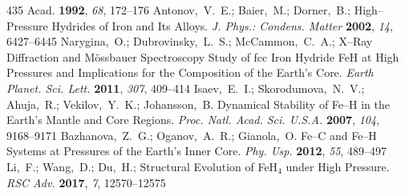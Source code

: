 \documentclass[12pt,letterpaper,oneside]{article}
\begin{document}
\begin{mcitethebibliography}{435}
{  Acad.} \textbf{1992}, \emph{68}, 172--176\relax
\mciteBstWouldAddEndPuncttrue
\mciteSetBstMidEndSepPunct{\mcitedefaultmidpunct}
{\mcitedefaultendpunct}{\mcitedefaultseppunct}\relax
\EndOfBibitem
{}
Antonov,~V.~E.; Baier,~M.; Dorner,~B.;
    High--Pressure Hydrides of Iron and Its Alloys. \emph{J.
  Phys.: Condens. Matter} \textbf{2002}, \emph{14}, 6427--6445\relax
\mciteBstWouldAddEndPuncttrue
\mciteSetBstMidEndSepPunct{\mcitedefaultmidpunct}
{\mcitedefaultendpunct}{\mcitedefaultseppunct}\relax
\EndOfBibitem
{}
Narygina,~O.; Dubrovinsky,~L.~S.; McCammon,~C.~A.;
    X--Ray Diffraction and M{\"o}ssbauer Spectroscopy Study of
  fcc Iron Hydride FeH at High Pressures and Implications for the Composition
  of the Earth's Core. \emph{Earth Planet. Sci. Lett.} \textbf{2011},
  \emph{307}, 409--414\relax
\mciteBstWouldAddEndPuncttrue
\mciteSetBstMidEndSepPunct{\mcitedefaultmidpunct}
{\mcitedefaultendpunct}{\mcitedefaultseppunct}\relax
\EndOfBibitem
{}
Isaev,~E.~I.; Skorodumova,~N.~V.; Ahuja,~R.; Vekilov,~Y.~K.; Johansson,~B.
  Dynamical Stability of Fe--H in the Earth's Mantle and Core Regions.
  \emph{Proc. Natl. Acad. Sci. U.S.A.} \textbf{2007}, \emph{104},
  9168--9171\relax
\mciteBstWouldAddEndPuncttrue
\mciteSetBstMidEndSepPunct{\mcitedefaultmidpunct}
{\mcitedefaultendpunct}{\mcitedefaultseppunct}\relax
\EndOfBibitem
{}
Bazhanova,~Z.~G.; Oganov,~A.~R.; Gianola,~O. Fe--C and Fe--H Systems at
  Pressures of the Earth's Inner Core. \emph{Phy. Usp.} \textbf{2012},
  \emph{55}, 489--497\relax
\mciteBstWouldAddEndPuncttrue
\mciteSetBstMidEndSepPunct{\mcitedefaultmidpunct}
{\mcitedefaultendpunct}{\mcitedefaultseppunct}\relax
\EndOfBibitem
{}
Li,~F.; Wang,~D.; Du,~H.;   Structural Evolution
  of FeH$_4$ under High Pressure. \emph{RSC Adv.} \textbf{2017}, \emph{7},
  12570--12575\relax
\mciteBstWouldAddEndPuncttrue
\mciteSetBstMidEndSepPunct{\mcitedefaultmidpunct}
{\mcitedefaultendpunct}{\mcitedefaultseppunct}\relax
\EndOfBibitem
{}

\end{mcitethebibliography}
\end{document}
